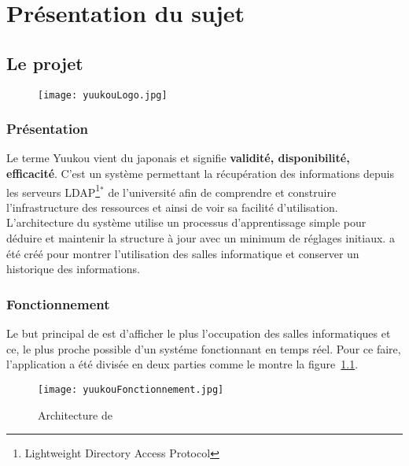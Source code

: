 \chapter{Pr\'esentation du sujet}

\section{Le projet \Yuukou}

\begin{figure}[!ht]
	\centering
	\texttt{[image: yuukouLogo.jpg]}

\end{figure}

\subsection{Pr\'esentation}

Le terme Yuukou vient du japonais \Yuukou{} et signifie \textbf{validit\'e, disponibilit\'e, efficacit\'e}. 
C'est un syst\`eme permettant la r\'ecup\'eration des informations depuis les serveurs LDAP\protect\footnote{Lightweight Directory Access Protocol}$^*$ de l'universit\'e afin de comprendre et construire l'infrastructure des ressources et ainsi de voir sa facilit\'e d'utilisation. 
L'architecture du syst\`eme utilise un processus d'apprentissage simple pour d\'eduire et maintenir la structure \`a jour avec un minimum de r\'eglages initiaux.
\Yuukou{} a \'et\'e cr\'e\'e pour montrer l'utilisation des salles informatique et conserver un historique des informations.

\subsection{Fonctionnement}

Le but principal de \Yuukou{} est d'afficher le plus l'occupation des salles informatiques et ce, le plus proche possible d'un syst\'eme fonctionnant en temps r\'eel.
Pour ce faire, l'application a \'et\'e divis\'ee en deux parties  comme le montre la figure~\ref{figure:yuukouFonctionnement}.

\clearpage

\begin{figure}[!ht]
	\centering
	\texttt{[image: yuukouFonctionnement.jpg]}
	\caption{Architecture de \Yuukou}
	\label{figure:yuukouFonctionnement}

\end{figure}

